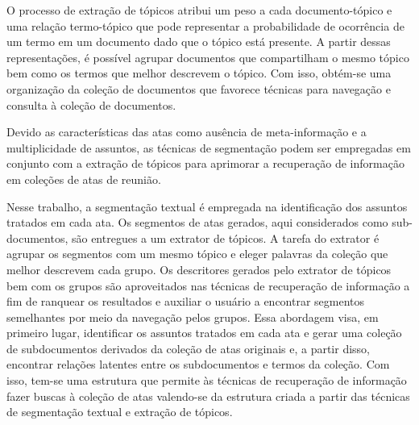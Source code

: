 O processo de extração de tópicos atribui um peso a cada documento-tópico e uma relação termo-tópico que pode representar a probabilidade de ocorrência de um termo em um documento dado que o tópico está presente. A partir dessas representações, é possível agrupar documentos que compartilham o mesmo tópico bem como os termos que melhor descrevem o tópico. Com isso, obtém-se uma organização da coleção de documentos que favorece técnicas para navegação e consulta à coleção de documentos. 
















Devido as características das atas como ausência de meta-informação e a multiplicidade de assuntos, as técnicas de segmentação podem ser empregadas em conjunto com a extração de tópicos para aprimorar a recuperação de informação em coleções de atas de reunião. 

Nesse trabalho, a segmentação textual é empregada na identificação dos assuntos tratados em cada ata. Os segmentos de atas gerados, aqui considerados como sub-documentos, são entregues a um extrator de tópicos. A tarefa do extrator é agrupar os segmentos com um mesmo tópico e eleger palavras da coleção que melhor descrevem cada grupo. Os descritores gerados pelo extrator de tópicos bem com os grupos são aproveitados nas técnicas de recuperação de informação a fim de ranquear os resultados e auxiliar o usuário a encontrar segmentos semelhantes por meio da navegação pelos grupos. Essa abordagem visa, em primeiro lugar, identificar os assuntos tratados em cada ata e gerar uma coleção de subdocumentos derivados da coleção de atas originais e, a partir disso, encontrar relações latentes entre os subdocumentos e termos da coleção. Com isso, tem-se uma estrutura que permite às técnicas de recuperação de informação fazer buscas à coleção de atas valendo-se da estrutura criada a partir das técnicas de segmentação textual e extração de tópicos. 










